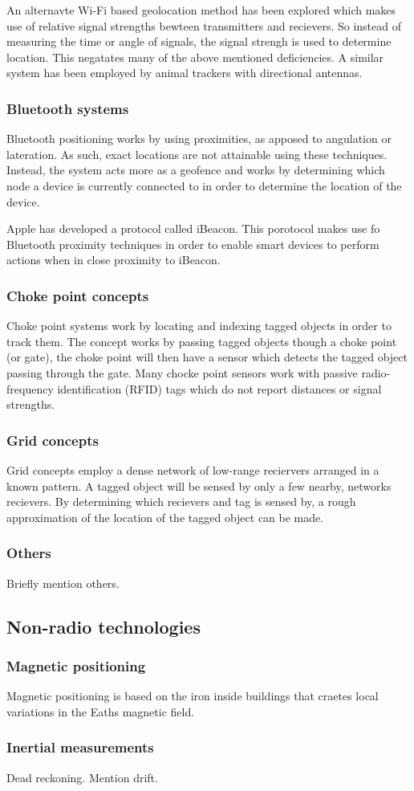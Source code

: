 An alternavte Wi-Fi based geolocation method has been explored which makes use of relative signal strengths bewteen transmitters and recievers. So instead of measuring the time or angle of signals, the signal strengh is used to determine location. This negatates many of the above mentioned deficiencies. A similar system has been employed by animal trackers with directional antennas.
\cite{yongguang_chen_signal_2002}

\subsubsection{Bluetooth systems}
Bluetooth positioning works by using proximities, as apposed to angulation or lateration. As such, exact locations are not attainable using these techniques. Instead, the system acts more as a geofence and works by determining which node a device is currently connected to in order to determine the location of the device.

Apple has developed a protocol called iBeacon. This porotocol makes use fo Bluetooth proximity techniques in order to enable smart devices to perform actions when in close proximity to iBeacon.
\cite{_everything_????}

\subsubsection{Choke point concepts}
Choke point systems work by locating and indexing tagged objects in order to track them. The concept works by passing tagged objects though a choke point (or gate), the choke point will then have a sensor which detects the tagged object passing through the gate. Many chocke point sensors work with passive radio-frequency identification (RFID) tags which do not report distances or signal strengths.
\cite{reza_investigation_2008}

\subsubsection{Grid concepts}
Grid concepts employ a dense network of low-range reciervers arranged in a known pattern. A tagged object will be sensed by only a few nearby, networks recievers. By determining which recievers and tag is sensed by, a rough approximation of the location of the tagged object can be made.

\subsubsection{Others}
Briefly mention others.

\subsection{Non-radio technologies}

\subsubsection{Magnetic positioning}
Magnetic positioning is based on the iron inside buildings that craetes local variations in the Eaths magnetic field.

\subsubsection{Inertial measurements}
Dead reckoning. Mention drift.


